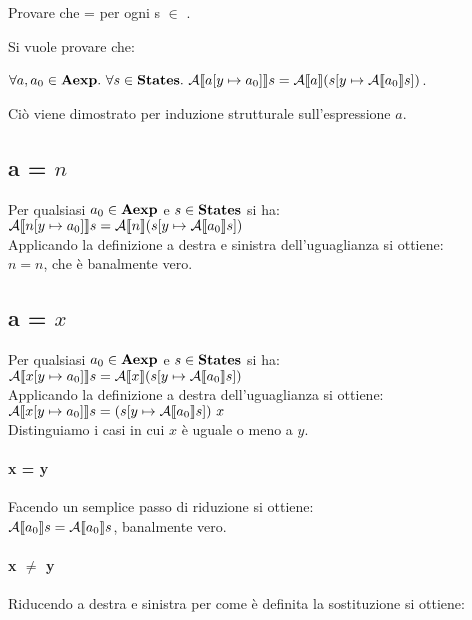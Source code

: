 {
	Provare che
	 =
	 per ogni s $\in$
	\states.
}
{
Si vuole provare che:

$\forall{a,a_0} \in \textbf{Aexp}.\mbox{ }
\forall{s} \in \textbf{States}.\mbox{ }
\mathcal{A} \llbracket a [y \mapsto{} a_0] \rrbracket s =
\mathcal{A} \llbracket a \rrbracket (s [y \mapsto{} \mathcal{A} \llbracket a_0 \rrbracket s])$.

Ciò viene dimostrato per induzione strutturale sull'espressione $a$.

\subsection{a = $n$} Per qualsiasi $a_0 \in \textbf{Aexp}$ e $s \in \textbf{States}$ si ha:
\\

$\mathcal{A} \llbracket n [y \mapsto{} a_0] \rrbracket s = \mathcal{A} \llbracket n \rrbracket (s [y \mapsto{} \mathcal{A} \llbracket a_0 \rrbracket s]) $
\\

Applicando la definizione  a destra e sinistra dell'uguaglianza si ottiene:
\\

$n = n$, che è banalmente vero.

\subsection{a = $x$} Per qualsiasi $a_0 \in \textbf{Aexp}$ e $s \in \textbf{States}$ si ha:
\\

$\mathcal{A} \llbracket x [y \mapsto{} a_0] \rrbracket s = \mathcal{A} \llbracket x \rrbracket (s [y \mapsto{} \mathcal{A} \llbracket a_0 \rrbracket s]) $
\\

Applicando la definizione  a destra dell'uguaglianza si ottiene:
\\

$\mathcal{A} \llbracket x [y \mapsto{} a_0] \rrbracket s = (s [y \mapsto{} \mathcal{A} \llbracket a_0 \rrbracket s]) \mbox{ } x $
\\

Distinguiamo i casi in cui $x$ è uguale o meno a $y$.

\paragraph{x = y} Facendo un semplice passo di riduzione si ottiene:
\\

$\mathcal{A} \llbracket a_0 \rrbracket s = \mathcal{A} \llbracket a_0 \rrbracket s$,
banalmente vero.

\paragraph{x $\neq$ y} Riducendo a destra e sinistra per come è definita la
sostituzione si ottiene:
\\

}
